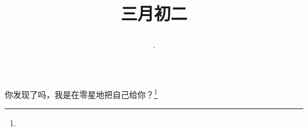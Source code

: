 \title{\date[d=10,m=4,y=2024][year:cn-y,年,month:cn,day:cn,日,·,weekday]·三月初二 }
你发现了吗，我是在零星地把自己给你？\footnote{ }

